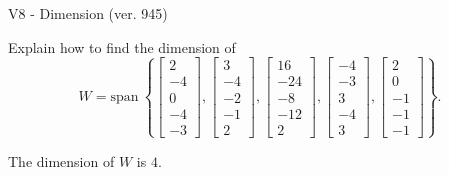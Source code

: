 \begin{exercise}
  \begin{exerciseTitle}V8 - Dimension (ver. 945)\end{exerciseTitle}
  \begin{exerciseStatement}
    Explain how to find the dimension of 
\[W=\mathrm{span}\ \left\{\left[\begin{array}{r}
2 \\
-4 \\
0 \\
-4 \\
-3
\end{array}\right] , \left[\begin{array}{r}
3 \\
-4 \\
-2 \\
-1 \\
2
\end{array}\right] , \left[\begin{array}{r}
16 \\
-24 \\
-8 \\
-12 \\
2
\end{array}\right] , \left[\begin{array}{r}
-4 \\
-3 \\
3 \\
-4 \\
3
\end{array}\right] , \left[\begin{array}{r}
2 \\
0 \\
-1 \\
-1 \\
-1
\end{array}\right]\right\}.\]



  \end{exerciseStatement}
  \begin{exerciseAnswer}
   The dimension of \(W\) is  \(4\).
  


  \end{exerciseAnswer}
\end{exercise}